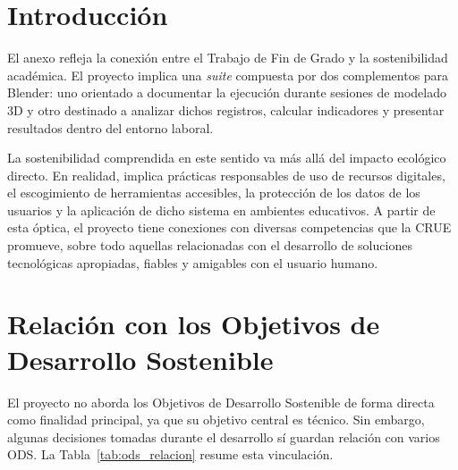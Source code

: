 \label{apendice:sostenibilizacion_curricular}

\section{Introducción}

El anexo refleja la conexión entre el Trabajo de Fin de Grado y la sostenibilidad académica. El proyecto implica una \textit{suite} compuesta por dos complementos para Blender: uno orientado a documentar la ejecución durante sesiones de modelado 3D y otro destinado a analizar dichos registros, calcular indicadores y presentar resultados dentro del entorno laboral.

La sostenibilidad comprendida en este sentido va más allá del impacto ecológico directo. En realidad, implica prácticas responsables de uso de recursos digitales, el escogimiento de herramientas accesibles, la protección de los datos de los usuarios y la aplicación de dicho sistema en ambientes educativos. A partir de esta óptica, el proyecto tiene conexiones con diversas competencias que la CRUE promueve, sobre todo aquellas relacionadas con el desarrollo de soluciones tecnológicas apropiadas, fiables y amigables con el usuario humano.

\section{Relación con los Objetivos de Desarrollo Sostenible}

El proyecto no aborda los Objetivos de Desarrollo Sostenible de forma directa como finalidad principal, ya que su objetivo central es técnico. Sin embargo, algunas decisiones tomadas durante el desarrollo sí guardan relación con varios ODS. La Tabla~\ref{tab:ods_relacion} resume esta vinculación.

